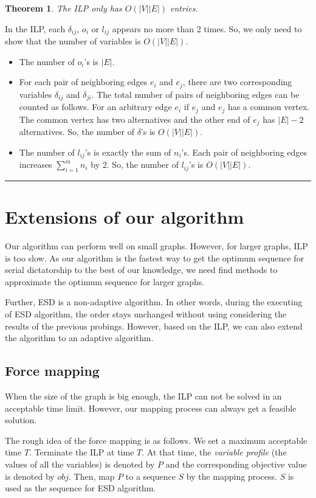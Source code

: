 \documentclass[letterpaper]{article}
\newtheorem{theorem}{Theorem}%
\newenvironment{proof}{{Proof:}}{\hfill\rule{2mm}{2mm}}
\begin{document}
\begin{theorem}
	The ILP only has $O(|V||E|)$ entries.
\end{theorem}
\begin{proof}
	In the ILP, each $\delta_{ij}$, $o_i$ or $l_{ij}$  appears no more than 2 times.
	So, we only need to show that the number of variables is $O(|V||E|)$.
	\begin{itemize}
		\item The number of $o_i$'s is $|E|$.
		\item For each pair of neighboring edges $e_i$ and $e_j$, there are two corresponding variables $\delta_{ij}$ and $\delta_{ji}$. The total number of pairs of neighboring edges can be counted as follows. For an arbitrary edge $e_i$ if $e_j$ and $e_j$ has a common vertex. The common vertex has two alternatives and the other end of $e_j$ has $|E|-2$ alternatives. So, the number of $\delta$'s is $O(|V||E|)$.
		\item The number of $l_{ij}$'s is exactly the sum of $n_i$'s. Each pair of neighboring edges increases $\sum_{i=1}^m n_i$ by 2. So, the number of $l_{ij}$'s is $O(|V||E|)$.
	\end{itemize}
\end{proof}

\section{Extensions of our algorithm}
Our algorithm can perform well on small graphs.
However, for larger graphs, ILP is too slow.
As our algorithm is the fastest way to get the optimum sequence for serial dictatorship to the best of our knowledge, we need find methods to approximate the optimum sequence for larger graphs.

Further, ESD is a non-adaptive algorithm.
In other words, during the executing of ESD algorithm, the order stays unchanged without using considering the results of the previous probings.   
However, based on the ILP, we can also extend the algorithm to an adaptive algorithm.

\subsection{Force mapping}
When the size of the graph is big enough, the ILP can not be solved in an acceptable time limit.
However, our mapping process can always get a feasible solution.

The rough idea of the force mapping is as follows.
We set a maximum acceptable time $T$.
Terminate the ILP at time $T$.
At that time, the \textit{variable profile} (the values of all the variables) is denoted by $P$ and the corresponding objective value is denoted by $obj$.
Then, map $P$ to a sequence $S$ by the mapping process.
$S$ is used as the sequence for ESD algorithm.
\end{document}
